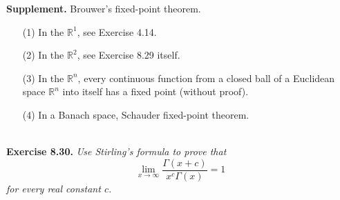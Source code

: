 \documentclass{article}
\begin{document}
\textbf{Supplement.} Brouwer's fixed-point theorem.
\begin{enumerate}
  \item[(1)]
    In the $\mathbb{R}^1$, see Exercise 4.14.

  \item[(2)]
    In the $\mathbb{R}^2$, see Exercise 8.29 itself.

  \item[(3)]
    In the $\mathbb{R}^n$,
    every continuous function from a closed ball of a Euclidean space $\mathbb{R}^n$
    into itself has a fixed point (without proof).

  \item[(4)]
    In a Banach space, Schauder fixed-point theorem. \\\\
\end{enumerate}






\textbf{Exercise 8.30.}
\emph{Use Stirling's formula to prove that
\[
  \lim_{x \to \infty} \frac{\Gamma(x+c)}{x^c \Gamma(x)} = 1
\]
for every real constant $c$.} \\
\end{document}
